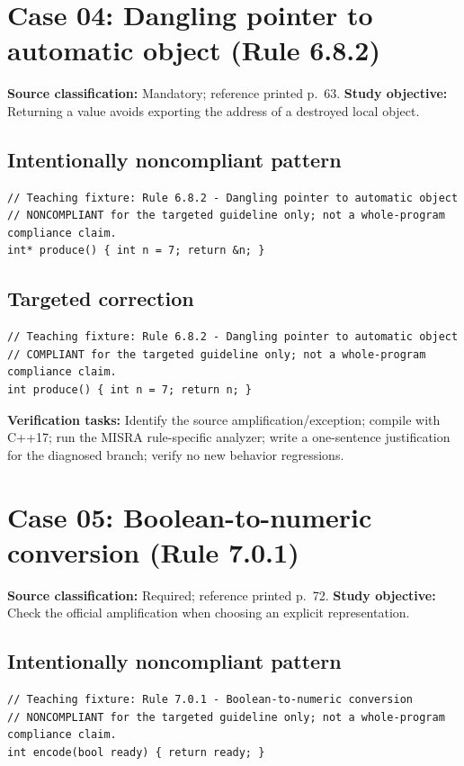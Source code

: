 \documentclass[10pt,letterpaper]{article}
\begin{document}
\section{Case 04: Dangling pointer to automatic object (Rule 6.8.2)}
\textbf{Source classification:} Mandatory; reference printed p.~63. \textbf{Study objective:} Returning a value avoids exporting the address of a destroyed local object.
\subsection*{Intentionally noncompliant pattern}
\begin{lstlisting}
// Teaching fixture: Rule 6.8.2 - Dangling pointer to automatic object
// NONCOMPLIANT for the targeted guideline only; not a whole-program compliance claim.
int* produce() { int n = 7; return &n; }
\end{lstlisting}
\subsection*{Targeted correction}
\begin{lstlisting}
// Teaching fixture: Rule 6.8.2 - Dangling pointer to automatic object
// COMPLIANT for the targeted guideline only; not a whole-program compliance claim.
int produce() { int n = 7; return n; }
\end{lstlisting}
\textbf{Verification tasks:} Identify the source amplification/exception; compile with C++17; run the MISRA rule-specific analyzer; write a one-sentence justification for the diagnosed branch; verify no new behavior regressions.

\section{Case 05: Boolean-to-numeric conversion (Rule 7.0.1)}
\textbf{Source classification:} Required; reference printed p.~72. \textbf{Study objective:} Check the official amplification when choosing an explicit representation.
\subsection*{Intentionally noncompliant pattern}
\begin{lstlisting}
// Teaching fixture: Rule 7.0.1 - Boolean-to-numeric conversion
// NONCOMPLIANT for the targeted guideline only; not a whole-program compliance claim.
int encode(bool ready) { return ready; }
\end{lstlisting}
\end{document}
